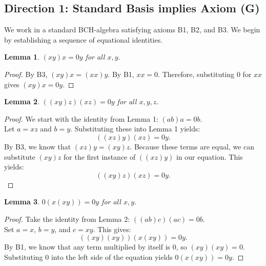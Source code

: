 \documentclass[11pt, a4paper]{article}
\newtheorem{lemma}{Lemma}
\begin{document}
\subsection{Direction 1: Standard Basis implies Axiom (G)}
We work in a standard BCH-algebra satisfying axioms B1, B2, and B3. We begin by establishing a sequence of equational identities.

\begin{lemma}
$(xy)x = 0y$ for all $x, y$.
\end{lemma}
\begin{proof}
By B3, $(xy)x = (xx)y$. By B1, $xx = 0$. Therefore, substituting $0$ for $xx$ gives $(xy)x = 0y$.
\end{proof}

\begin{lemma}
$((xy)z)(xz) = 0y$ for all $x, y, z$.
\end{lemma}
\begin{proof}
We start with the identity from Lemma 1: $(ab)a = 0b$. \\
Let $a = xz$ and $b = y$. Substituting these into Lemma 1 yields:
\[ ((xz)y)(xz) = 0y. \]
By B3, we know that $(xz)y = (xy)z$. Because these terms are equal, we can substitute $(xy)z$ for the first instance of $((xz)y)$ in our equation. This yields:
\[ ((xy)z)(xz) = 0y. \]
\end{proof}

\bigskip

\begin{lemma}
$0(x(xy)) = 0y$ for all $x, y$.
\end{lemma}
\begin{proof}
Take the identity from Lemma 2: $((ab)c)(ac) = 0b$. \\
Set $a = x$, $b = y$, and $c = xy$. This gives:
\[ ((xy)(xy))(x(xy)) = 0y. \]
By B1, we know that any term multiplied by itself is $0$, so $(xy)(xy) = 0$. Substituting $0$ into the left side of the equation yields $0(x(xy)) = 0y$.
\end{proof}
\end{document}
